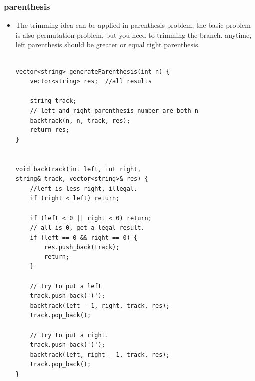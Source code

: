 \documentclass[a4paper,11pt,twoside]{book}
\begin{document}
\subsubsection{parenthesis}
\begin{itemize}
	\item The trimming idea can be applied in parenthesis problem, the basic problem is also permutation problem, but you need to trimming the branch. 
	anytime, left parenthesis should be greater or equal right parenthesis. 
\begin{lstlisting}

vector<string> generateParenthesis(int n) {
	vector<string> res;  //all results
	
	string track;
	// left and right parenthesis number are both n
	backtrack(n, n, track, res);
	return res;
}


void backtrack(int left, int right, 
string& track, vector<string>& res) {
	//left is less right, illegal.
	if (right < left) return;
	
	if (left < 0 || right < 0) return;
	// all is 0, get a legal result.
	if (left == 0 && right == 0) {
		res.push_back(track);
		return;
	}
	
	// try to put a left 
	track.push_back('('); 
	backtrack(left - 1, right, track, res);
	track.pop_back(); 
	
	// try to put a right.
	track.push_back(')'); 
	backtrack(left, right - 1, track, res);
	track.pop_back(); 
}
\end{lstlisting}
\end{itemize}
\end{document}
